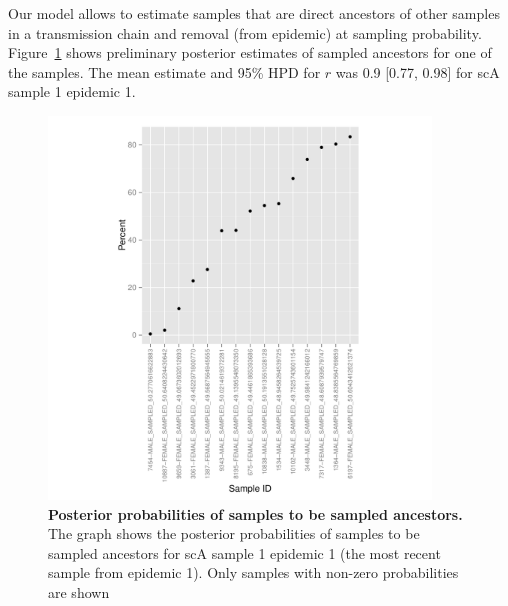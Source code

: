 \documentclass[12pt]{article}
\begin{document}
Our model allows to estimate samples that are direct ancestors of other samples in a transmission chain and removal (from epidemic) at sampling probability. Figure~\ref{fig: SA} shows preliminary posterior estimates of sampled ancestors for one of the samples. The mean estimate and 95\% HPD for $r$ was 0.9 [0.77, 0.98] for scA sample 1 epidemic 1. 
\begin{center} 
\begin{figure}[!h]
\includegraphics[width=4in]{sa_graph_scA}
\caption{\footnotesize {\bf Posterior probabilities of samples to be sampled ancestors.} 
The graph shows the posterior probabilities of samples to be sampled ancestors for scA sample 1 epidemic 1 (the most recent sample from epidemic 1). Only samples with non-zero probabilities are shown} 
\label{fig: SA} 
\end{figure}
\end{center} 
\end{document}
